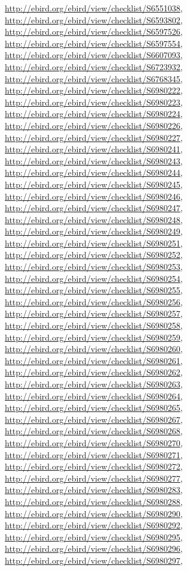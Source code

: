 \documentclass[9pt, article]{memoir}
\begin{document}
\begin{multicols}{2}
\url{http://ebird.org/ebird/view/checklist/S6551038}, 
\url{http://ebird.org/ebird/view/checklist/S6593802}, 
\url{http://ebird.org/ebird/view/checklist/S6597526}, 
\url{http://ebird.org/ebird/view/checklist/S6597554}, 
\url{http://ebird.org/ebird/view/checklist/S6607093}, 
\url{http://ebird.org/ebird/view/checklist/S6723932}, 
\url{http://ebird.org/ebird/view/checklist/S6768345}, 
\url{http://ebird.org/ebird/view/checklist/S6980222}, 
\url{http://ebird.org/ebird/view/checklist/S6980223}, 
\url{http://ebird.org/ebird/view/checklist/S6980224}, 
\url{http://ebird.org/ebird/view/checklist/S6980226}, 
\url{http://ebird.org/ebird/view/checklist/S6980227}, 
\url{http://ebird.org/ebird/view/checklist/S6980241}, 
\url{http://ebird.org/ebird/view/checklist/S6980243}, 
\url{http://ebird.org/ebird/view/checklist/S6980244}, 
\url{http://ebird.org/ebird/view/checklist/S6980245}, 
\url{http://ebird.org/ebird/view/checklist/S6980246}, 
\url{http://ebird.org/ebird/view/checklist/S6980247}, 
\url{http://ebird.org/ebird/view/checklist/S6980248}, 
\url{http://ebird.org/ebird/view/checklist/S6980249}, 
\url{http://ebird.org/ebird/view/checklist/S6980251}, 
\url{http://ebird.org/ebird/view/checklist/S6980252}, 
\url{http://ebird.org/ebird/view/checklist/S6980253}, 
\url{http://ebird.org/ebird/view/checklist/S6980254}, 
\url{http://ebird.org/ebird/view/checklist/S6980255}, 
\url{http://ebird.org/ebird/view/checklist/S6980256}, 
\url{http://ebird.org/ebird/view/checklist/S6980257}, 
\url{http://ebird.org/ebird/view/checklist/S6980258}, 
\url{http://ebird.org/ebird/view/checklist/S6980259}, 
\url{http://ebird.org/ebird/view/checklist/S6980260}, 
\url{http://ebird.org/ebird/view/checklist/S6980261}, 
\url{http://ebird.org/ebird/view/checklist/S6980262}, 
\url{http://ebird.org/ebird/view/checklist/S6980263}, 
\url{http://ebird.org/ebird/view/checklist/S6980264}, 
\url{http://ebird.org/ebird/view/checklist/S6980265}, 
\url{http://ebird.org/ebird/view/checklist/S6980267}, 
\url{http://ebird.org/ebird/view/checklist/S6980268}, 
\url{http://ebird.org/ebird/view/checklist/S6980270}, 
\url{http://ebird.org/ebird/view/checklist/S6980271}, 
\url{http://ebird.org/ebird/view/checklist/S6980272}, 
\url{http://ebird.org/ebird/view/checklist/S6980277}, 
\url{http://ebird.org/ebird/view/checklist/S6980283}, 
\url{http://ebird.org/ebird/view/checklist/S6980288}, 
\url{http://ebird.org/ebird/view/checklist/S6980290}, 
\url{http://ebird.org/ebird/view/checklist/S6980292}, 
\url{http://ebird.org/ebird/view/checklist/S6980295}, 
\url{http://ebird.org/ebird/view/checklist/S6980296}, 
\url{http://ebird.org/ebird/view/checklist/S6980297}, 

\end{multicols}
\end{document}
